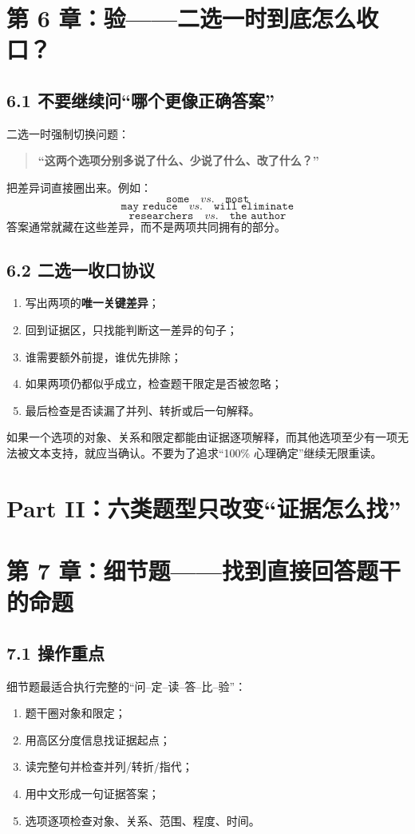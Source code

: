 \documentclass[11pt,a4paper]{ctexart}
\newcommand{\kw}[1]{\textbf{#1}}
\begin{document}
\section{第 6 章：验——二选一时到底怎么收口？}

\subsection{6.1 不要继续问“哪个更像正确答案”}
二选一时强制切换问题：
\begin{quote}
\kw{“这两个选项分别多说了什么、少说了什么、改了什么？”}
\end{quote}
把差异词直接圈出来。例如：
\[
\texttt{some} \quad vs. \quad \texttt{most}
\]
\[
\texttt{may reduce} \quad vs. \quad \texttt{will eliminate}
\]
\[
\texttt{researchers} \quad vs. \quad \texttt{the author}
\]
答案通常就藏在这些差异，而不是两项共同拥有的部分。

\subsection{6.2 二选一收口协议}
\begin{enumerate}
  \item 写出两项的\kw{唯一关键差异}；
  \item 回到证据区，只找能判断这一差异的句子；
  \item 谁需要额外前提，谁优先排除；
  \item 如果两项仍都似乎成立，检查题干限定是否被忽略；
  \item 最后检查是否读漏了并列、转折或后一句解释。
\end{enumerate}

\begin{exam}[一个非常实用的停止标准]
如果一个选项的对象、关系和限定都能由证据逐项解释，而其他选项至少有一项无法被文本支持，就应当确认。不要为了追求“100\% 心理确定”继续无限重读。
\end{exam}

\newpage
\section{Part II：六类题型只改变“证据怎么找”}

\section{第 7 章：细节题——找到直接回答题干的命题}

\subsection{7.1 操作重点}
细节题最适合执行完整的“问--定--读--答--比--验”：
\begin{enumerate}
  \item 题干圈对象和限定；
  \item 用高区分度信息找证据起点；
  \item 读完整句并检查并列/转折/指代；
  \item 用中文形成一句证据答案；
  \item 选项逐项检查对象、关系、范围、程度、时间。
\end{enumerate}
\end{document}
